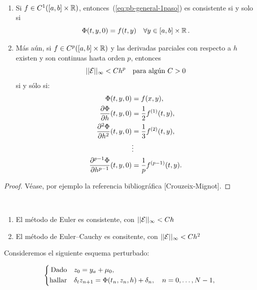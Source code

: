 \begin{theorem}[Consistencia]~
  \label{thm:consitencia-pb-general-1paso}
  \begin{enumerate}
  \item Si $f\in C^1([\ta,\tb]\times\Rset)$,
    entonces~(\ref{eq:pb-general-1paso}) es consistente si y solo si 
    \begin{equation*}
      \Phi(t,y,0) = f(t,y)\quad \forall y\in[\ta,\tb]\times\Rset.
    \end{equation*}
  \item Más aún, si $f\in C^p([\ta,\tb]\times\Rset)$ y las derivadas
    parciales con respecto a $h$ existen y son continuas hasta orden
    $p$, entonces
    $$ ||{\cal E}||_\infty<C h^p \quad \text{para algún $C>0$}$$
    si y sólo si:
    \begin{align*}
      \Phi(t,y,0) &= f(x,y), \\
      \frac{\partial\Phi}{\partial h}(t,y,0) &=
      \frac{1}{2}\Dtotal1 f(t,y),
      \\
      \frac{\partial^2\Phi}{\partial h^2}(t,y,0) &=
      \frac{1}{3}\Dtotal2 f(t,y),
      \\
      &\vdots
      \\
      \frac{\partial^{p-1}\Phi}{\partial h^{p-1}}(t,y,0) &=
      \frac{1}{p} \Dtotal{p-1} f(t,y).
    \end{align*}
  \end{enumerate}
\end{theorem}

\begin{proof}
  Véase, por ejemplo la referencia bibliográfica
  [Crouzeix-Mignot].
\end{proof}

\begin{example}~
  \begin{enumerate}
  \item 
    El método de Euler es consistente, con  $ ||{\cal E}||_\infty<C h $
  \item El método de Euler--Cauchy es consitente, con $ ||{\cal
      E}||_\infty<C h^2 $
  \end{enumerate}
\end{example}

Consideremos el siguiente esquema perturbado:

\begin{equation}
  \label{eq:pb-perturbado-general-1paso} 
  \left\{
  \begin{aligned}
    \text{Dado}\quad &z_0 = \ycero+\mu_0,\\
    \text{hallar}\quad &\ddt z_{n+1} = \Phi(\tn,z_n, h) + \delta_n, \quad
    n=0,\dots, N-1,
  \end{aligned}
  \right.
\end{equation}

